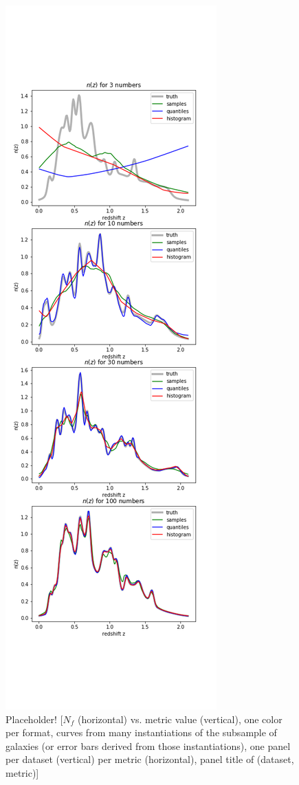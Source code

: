 \documentclass[\docopts]{\docclass}
\begin{document}
\begin{figure}
  \includegraphics[width=0.9\columnwidth]{figures/stacked_placeholder.png}
  \caption{Placeholder! [$N_{f}$ (horizontal) vs. metric value (vertical), one 
color per format, curves from many instantiations of the subsample of galaxies 
(or error bars derived from those instantiations), one panel per dataset 
(vertical) per metric (horizontal), panel title of (dataset, metric)]
  \label{fig:stacked}}
\end{figure}
\end{document}
